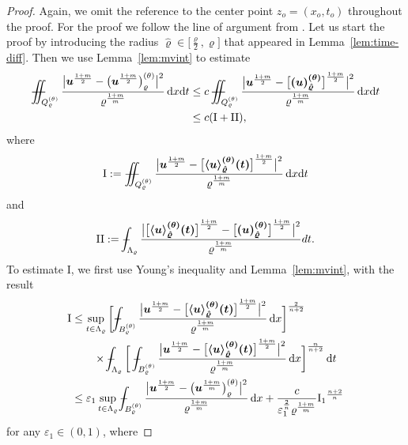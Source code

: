 \documentclass[a4paper, 10pt, american]{amsart}
\numberwithin{theorem}{section}
\numberwithin{equation}{section}
\newcommand{\mint}{- \mskip-19,5mu \int}
\newcommand{\dxdt}{\,\mathrm{d}x\mathrm{d}t}
\newcommand{\dx}{\,\mathrm{d}x}
\newcommand{\dt}{\,\mathrm{d}t}
\renewcommand{\epsilon}{\varepsilon}
\renewcommand{\epsilon}{\varepsilon}
\renewcommand{\rho}{\varrho}
\newcommand{\power}[2]{\bm{#1^{\mbox{\unboldmath{\scriptsize$#2$}}}}}
\def\Xint#1{\mathchoice
    {\XXint\displaystyle\textstyle{#1}}%
    {\XXint\textstyle\scriptstyle{#1}}%
    {\XXint\scriptstyle\scriptscriptstyle{#1}}%
    {\XXint\scriptscriptstyle\scriptscriptstyle{#1}}%
    \!\int}
\def\XXint#1#2#3{\setbox0=\hbox{$#1{#2#3}{\int}$}
    \vcenter{\hbox{$#2#3$}}\kern-0.5\wd0}
\def\bint{\Xint-}
\def\Xiint#1{\mathchoice
    {\XXiint\displaystyle\textstyle{#1}}%
    {\XXiint\textstyle\scriptstyle{#1}}%
    {\XXiint\scriptstyle\scriptscriptstyle{#1}}%
    {\XXiint\scriptscriptstyle\scriptscriptstyle{#1}}%
    \!\iint}
\def\XXiint#1#2#3{\setbox0=\hbox{$#1{#2#3}{\iint}$}
    \vcenter{\hbox{$#2#3$}}\kern-0.5\wd0}
\def\biint{\Xiint{-\!-}}
\def\<{\langle}
\def\>{\rangle}
\begin{document}
\begin{proof}
Again, we omit the reference to the center point $z_o=(x_o,t_o)$
throughout the proof. For the proof we follow the line of argument
from \cite[Lemma 5.1]{BDS-singular-higher-int}.
Let us start the proof by introducing the radius $\hat{\rho} \in\big[
\frac\rho2 , \rho \big]$ that appeared in Lemma~\ref{lem:time-diff}.
Then we use Lemma~\ref{lem:mvint} to estimate
\begin{align}\label{Estimate}\nonumber
\biint_{Q_\rho^{(\theta)}}\frac{\big|\power u {\frac{1+m}2}- \big(\power u {\frac{1+m}2}\big)_\rho^{(\theta)}\big|^2}{\rho^{\frac{1+m}m}}\dxdt
&\le
c\,\biint_{Q_\rho^{(\theta)}}\frac{\big|\power u {\frac{1+m}2}- \power{\big[(u)_{\hat\rho}^{(\theta)}\big]} {\frac{1+m}2}\big|^2}{\rho^{\frac{1+m}m}}\dxdt\\
&\le
c({\rm{I+II}}),
\end{align}
where
\begin{align*}
{\rm{I}} :=
\biint_{Q_\rho^{(\theta)}}\frac{\big| \power u{\frac{1+m}2} - \power{\big[\<u\>_{\hat{\rho}}^{(\theta)}(t)\big]}{\frac{1+m}2} \big|^2 }{\rho^{\frac{1+m}m}} \dxdt
\end{align*}
and
\begin{align*}
{\rm{II}} :=
\bint_{\Lambda_\rho}\frac{\big|  \power{\big[\<u\>_{\hat{\rho}}^{(\theta)}(t)\big]}{\frac{1+m}2} - \power{\big[ (u)_{\hat{\rho}}^{(\theta)} \big]}{\frac{1+m}2} \big|^2 }{\rho^{\frac{1+m}m}} dt.
\end{align*}
To estimate {\rm{I}}, we first use Young's inequality and
Lemma~\ref{lem:mvint}, with the result
\begin{align}\label{est-I-a}
{\rm{I}} 
&\le
\sup_{t\in \Lambda_\rho}\bigg[\bint_{B_\rho^{(\theta)} }\frac{\big|\power u{\frac{1+m}2} - \power{\big[\<u\>_{\hat{\rho}}^{(\theta)}(t)\big]}{\frac{1+m}2}\big|^2}{\rho^\frac{1+m}m}  \dx\bigg]^\frac2{n+2} \nonumber\\
&\qquad\times
\mint_{\Lambda_{\rho}}\bigg[\mint_{B_\rho^{(\theta)}} \frac{\big|\power u {\frac{1+m}2} - \power{\big[\< u\>_{\hat{\rho}}^{(\theta)}(t)\big]}{\frac{1+m}{2}} \big|^2}{\rho^\frac{1+m}m} \dx\bigg]^\frac{n}{n+2} \dt \nonumber\\
&\le
\epsilon_1\sup_{t\in \Lambda_\rho}\bint_{B_\rho^{(\theta)} }\frac{\big|\power u{\frac{1+m}2} - \big(\power u{\frac{1+m}m}\big)_\rho^{(\theta)}\big|^2 }{\rho^{\frac{1+m}m}} \dx
+
\frac{c}{\epsilon_1^{\frac{2}{n}}\rho^\frac{1+m}m} {\rm{I}_1}^\frac{n+2}n
\end{align}
for any $\epsilon_1\in(0,1)$, where


\end{proof}
\end{document}
